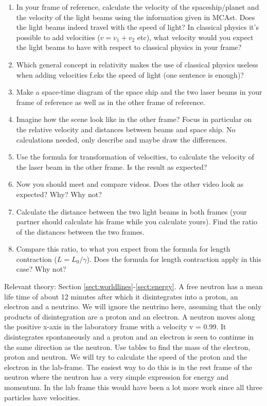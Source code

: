 {\begin{multicols}{2}
\begin{enumerate}
\item In your frame of reference, calculate the velocity of the spaceship/planet and the velocity of the light beams using the information given in MCAst. Does the light beams indeed travel with the speed of light? In classical physics it's possible to add velocities ($v=v_1+v_2$ etc), what velocity would you expect the light beams to have with respect to classical physics in your frame?
\item Which general concept in relativity makes the use of classical physics useless when adding velocities f.eks the speed of light (one sentence is enough)?
\item Make a space-time diagram of the space ship and the two laser beams in your frame of reference as well as in the other frame of reference.
\item Imagine how the scene look like in the other frame? Focus in particular on the relative velocity and distances between beams and space ship. No calculations needed, only describe and maybe draw the differences.
\item Use the formula for transformation of velocities, to calculate the velocity of the laser beam in the other frame. Is the result as expected?
\item Now you should meet and compare videos. Does the other video look as expected? Why? Why not?
\item Calculate the distance between the two light beams in both frames (your partner should calculate his frame while you calculate yours). Find the ratio of the distances between the two frames.
\item Compare this ratio, to what you expect from the formula for length contraction ($L=L_0/\gamma$). Does the formula for length contraction apply in this case? Why not?
\end{enumerate}




\vspace{1cm}
\pagebreak[3]


Relevant theory: Section \ref{sect:worldlines}-\ref{sect:energy}.\newline
A free neutron
has a mean life time of about 12 minutes after
which it disintegrates into a proton, an electron
and a neutrino. We will ignore the neutrino here,
assuming that the only products of disintegration
are a proton and an electron. A neutron moves
along the positive x-axis in the laboratory frame
with a velocity v = 0.99. It disintegrates spontaneously
and a proton and an electron is seen
to continue in the same direction as the neutron.
Use tables to find the mass of the electron, proton
and neutron. We will try to calculate the speed
of the proton and the electron in the lab-frame.
The easiest way to do this is in the rest frame of
the neutron where the neutron has a very simple
expression for energy and momentum. In the lab
frame this would have been a lot more work since
all three particles have velocities.


\end{multicols}}
